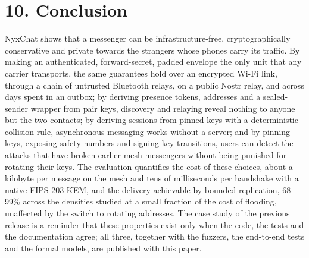 \documentclass[conference]{IEEEtran}
\begin{document}
\section{10. Conclusion}
NyxChat shows that a messenger can be infrastructure-free, cryptographically conservative and private towards the strangers whose phones carry its traffic. By making an authenticated, forward-secret, padded envelope the only unit that any carrier transports, the same guarantees hold over an encrypted Wi-Fi link, through a chain of untrusted Bluetooth relays, on a public Nostr relay, and across days spent in an outbox; by deriving presence tokens, addresses and a sealed-sender wrapper from pair keys, discovery and relaying reveal nothing to anyone but the two contacts; by deriving sessions from pinned keys with a deterministic collision rule, asynchronous messaging works without a server; and by pinning keys, exposing safety numbers and signing key transitions, users can detect the attacks that have broken earlier mesh messengers without being punished for rotating their keys. The evaluation quantifies the cost of these choices, about a kilobyte per message on the mesh and tens of milliseconds per handshake with a native FIPS 203 KEM, and the delivery achievable by bounded replication, 68-99\% across the densities studied at a small fraction of the cost of flooding, unaffected by the switch to rotating addresses. The case study of the previous release is a reminder that these properties exist only when the code, the tests and the documentation agree; all three, together with the fuzzers, the end-to-end tests and the formal models, are published with this paper.
\end{document}
